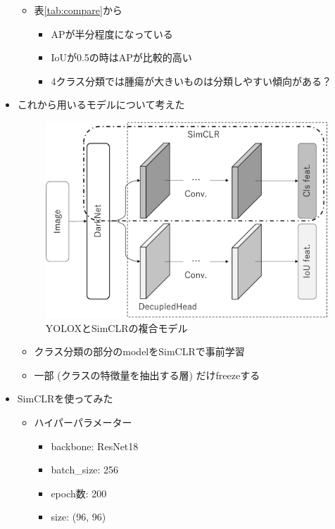 \documentclass[a4j]{ujarticle}
\newcommand{\Tref}[1]{\mbox{表\ref{tab:#1}}}
\begin{document}
\begin{itemize}
\begin{itemize}
                \item \Tref{compare}から
                \begin{itemize}
                    \item APが半分程度になっている
                    \item IoUが0.5の時はAPが比較的高い
                    \item 4クラス分類では腫瘍が大きいものは分類しやすい傾向がある？
                \end{itemize}
            \end{itemize}

\clearpage

            \item これから用いるモデルについて考えた
            \begin{figure}[h]
                \centering
                \includegraphics[width=.73\linewidth]{../fig/model.pdf}
                \caption{YOLOX\cite{yolox}とSimCLR\cite{simclr}の複合モデル}
                \label{fig:model}
            \end{figure}
            \begin{itemize}
                \item クラス分類の部分のmodelをSimCLR\cite{simclr}で事前学習
                \item 一部 (クラスの特徴量を抽出する層) だけfreezeする
            \end{itemize}
            \item SimCLR\cite{simclr}を使ってみた
            \begin{itemize}
                \item ハイパーパラメーター
                \begin{itemize}
                    \item backbone: ResNet18
                    \item batch\_size: 256
                    \item epoch数: 200
                    \item size: (96, 96)
                \end{itemize}
            \end{itemize}


\end{itemize}
\end{document}
